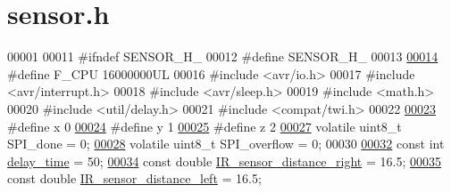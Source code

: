 \hypertarget{sensor_8h_source}{}\section{sensor.\+h}
\label{sensor_8h_source}

\begin{DoxyCode}
00001 
00011 \textcolor{preprocessor}{#ifndef SENSOR\_H\_}
00012 \textcolor{preprocessor}{#define SENSOR\_H\_}
00013 
\hypertarget{sensor_8h_source.tex_l00014}{}\hyperlink{sensor_8h_a43bafb28b29491ec7f871319b5a3b2f8}{00014} \textcolor{preprocessor}{#define F\_CPU 16000000UL    }
00016 \textcolor{preprocessor}{#include <avr/io.h>}
00017 \textcolor{preprocessor}{#include <avr/interrupt.h>}
00018 \textcolor{preprocessor}{#include <avr/sleep.h>}
00019 \textcolor{preprocessor}{#include <math.h>}
00020 \textcolor{preprocessor}{#include <util/delay.h>}
00021 \textcolor{preprocessor}{#include <compat/twi.h>}
00022 
\hypertarget{sensor_8h_source.tex_l00023}{}\hyperlink{sensor_8h_a6c4b361d72eb3767ba424ac9a6ecf52b}{00023} \textcolor{preprocessor}{#define x 0             }
\hypertarget{sensor_8h_source.tex_l00024}{}\hyperlink{sensor_8h_a0ed6a908288e0cd87f79c1b5ab56d07c}{00024} \textcolor{preprocessor}{#define y 1             }
\hypertarget{sensor_8h_source.tex_l00025}{}\hyperlink{sensor_8h_afb573e69f3b198fe9ca91079c4a402a9}{00025} \textcolor{preprocessor}{#define z 2             }
\hypertarget{sensor_8h_source.tex_l00027}{}\hyperlink{sensor_8h_a320a1ee237ba550bcdffd131a4198e17}{00027} \textcolor{preprocessor}{volatile uint8\_t SPI\_done = 0;      }
\hypertarget{sensor_8h_source.tex_l00028}{}\hyperlink{sensor_8h_a2c687b5d4d67e6900cd35ec11107a4ee}{00028} \textcolor{preprocessor}{volatile uint8\_t SPI\_overflow = 0;  }
00030 \textcolor{preprocessor}{}
\hypertarget{sensor_8h_source.tex_l00032}{}\hyperlink{sensor_8h_abf692cf614d069eb741fe7ee8a5bd31d}{00032} \textcolor{keyword}{const} \textcolor{keywordtype}{int} \hyperlink{sensor_8h_abf692cf614d069eb741fe7ee8a5bd31d}{delay\_time} = 50;            
\hypertarget{sensor_8h_source.tex_l00034}{}\hyperlink{sensor_8h_ae76d77cd1b87b203973ac8baa4081271}{00034} \textcolor{keyword}{const} \textcolor{keywordtype}{double} \hyperlink{sensor_8h_ae76d77cd1b87b203973ac8baa4081271}{IR\_sensor\_distance\_right} = 16.5;       
\hypertarget{sensor_8h_source.tex_l00035}{}\hyperlink{sensor_8h_a85db4bba6dcce96787150b0aa1c9c978}{00035} \textcolor{keyword}{const} \textcolor{keywordtype}{double} \hyperlink{sensor_8h_a85db4bba6dcce96787150b0aa1c9c978}{IR\_sensor\_distance\_left} = 16.5;     

\end{DoxyCode}
